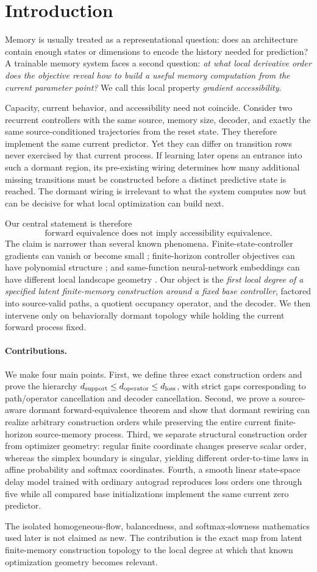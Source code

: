 \section{Introduction}

Memory is usually treated as a representational question: does an architecture contain enough states or dimensions to encode the history needed for prediction? A trainable memory system faces a second question: \emph{at what local derivative order does the objective reveal how to build a useful memory computation from the current parameter point?} We call this local property \emph{gradient accessibility}.

Capacity, current behavior, and accessibility need not coincide. Consider two recurrent controllers with the same source, memory size, decoder, and exactly the same source-conditioned trajectories from the reset state. They therefore implement the same current predictor. Yet they can differ on transition rows never exercised by that current process. If learning later opens an entrance into such a dormant region, its pre-existing wiring determines how many additional missing transitions must be constructed before a distinct predictive state is reached. The dormant wiring is irrelevant to what the system computes now but can be decisive for what local optimization can build next.

Our central statement is therefore
\[
\boxed{\text{forward equivalence does not imply accessibility equivalence}.}
\]
The claim is narrower than several known phenomena. Finite-state-controller gradients can vanish or become small \citep{aberdeen2002scaling}; finite-horizon controller objectives can have polynomial structure \citep{boularias2009predictive}; and same-function neural-network embeddings can have different local landscape geometry \citep{fukumizu2019semiflat}. Our object is the \emph{first local degree of a specified latent finite-memory construction around a fixed base controller}, factored into source-valid paths, a quotient occupancy operator, and the decoder. We then intervene only on behaviorally dormant topology while holding the current forward process fixed.

\paragraph{Contributions.}
We make four main points. First, we define three exact construction orders and prove the hierarchy $d_{\mathrm{support}}\leq d_{\mathrm{operator}}\leq d_{\mathrm{loss}}$, with strict gaps corresponding to path/operator cancellation and decoder cancellation. Second, we prove a source-aware dormant forward-equivalence theorem and show that dormant rewiring can realize arbitrary construction orders while preserving the entire current finite-horizon source-memory process. Third, we separate structural construction order from optimizer geometry: regular finite coordinate changes preserve scalar order, whereas the simplex boundary is singular, yielding different order-to-time laws in affine probability and softmax coordinates. Fourth, a smooth linear state-space delay model trained with ordinary autograd reproduces loss orders one through five while all compared base initializations implement the same current zero predictor.

The isolated homogeneous-flow, balancedness, and softmax-slowness mathematics used later is not claimed as new. The contribution is the exact map from latent finite-memory construction topology to the local degree at which that known optimization geometry becomes relevant.
